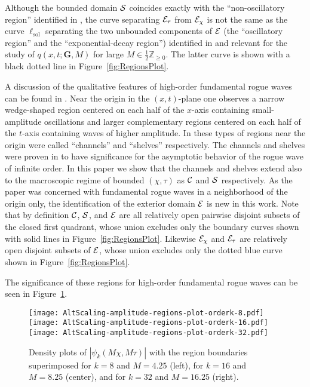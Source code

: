 \begin{remark}
Although the bounded domain $\mathcal{S}$ coincides exactly with the ``non-oscillatory region'' identified in \cite{BilmanBW19}, the curve separating $\mathcal{E}_\tau$ from $\mathcal{E}_\chi$ is not the same as the curve $\ell_\mathrm{sol}$ separating the two unbounded components of $\mathcal{E}$ (the ``oscillatory region'' and the ``exponential-decay region'') identified in \cite{BilmanBW19} and relevant for the study of $q(x,t;\mathbf{G},M)$ for large $M\in\tfrac{1}{2}\mathbb{Z}_{\ge 0}$.  The latter curve is shown with a black dotted line in Figure~\ref{fig:RegionsPlot}.
\end{remark}

A discussion of the qualitative features of high-order fundamental rogue waves can be found in \cite[Section 1.1]{BilmanLM20}.  Near the origin in the $(x,t)$-plane one observes a narrow wedge-shaped region centered on each half of the $x$-axis containing small-amplitude oscillations and larger complementary regions centered on each half of the $t$-axis containing waves of higher amplitude.  In \cite[Section 1.1]{BilmanLM20} these types of regions near the origin were called ``channels'' and ``shelves'' respectively.  The channels and shelves were proven in \cite{BilmanLM20} to have significance for the asymptotic behavior of the rogue wave of infinite order.  In this paper we show that the channels and shelves extend also to the macroscopic regime of bounded $(\chi,\tau)$ as $\mathcal{C}$ and $\mathcal{S}$ respectively. As the paper \cite{BilmanLM20} was concerned with fundamental rogue waves in a neighborhood of the origin only, the identification of the exterior domain $\mathcal{E}$ is new in this work.  Note that by definition $\mathcal{C}$, $\mathcal{S}$, and $\mathcal{E}$ are all relatively open pairwise disjoint subsets of the closed first quadrant, whose union excludes only the boundary curves shown with solid lines in Figure~\ref{fig:RegionsPlot}.  Likewise $\mathcal{E}_\chi$ and $\mathcal{E}_\tau$ are relatively open disjoint subsets of $\mathcal{E}$, whose union excludes only the dotted blue curve shown in Figure~\ref{fig:RegionsPlot}.

The significance of these regions for high-order fundamental rogue waves can be seen in Figure~\ref{fig:2D-Plots}.  
\begin{figure}[h]
\begin{center}
\phantom{!}\hfill%
\texttt{[image: AltScaling-amplitude-regions-plot-orderk-8.pdf]}%
\hfill%
\texttt{[image: AltScaling-amplitude-regions-plot-orderk-16.pdf]}%
\hfill%
\texttt{[image: AltScaling-amplitude-regions-plot-orderk-32.pdf]}%
\hfill\phantom{!}%
\end{center}
\caption{Density plots of $|\psi_k(M\chi,M\tau)|$ with the region boundaries superimposed for $k=8$ and $M=4.25$ (left), for $k=16$ and $M=8.25$ (center), and for $k=32$ and $M=16.25$ (right).}
\label{fig:2D-Plots}
\end{figure}

